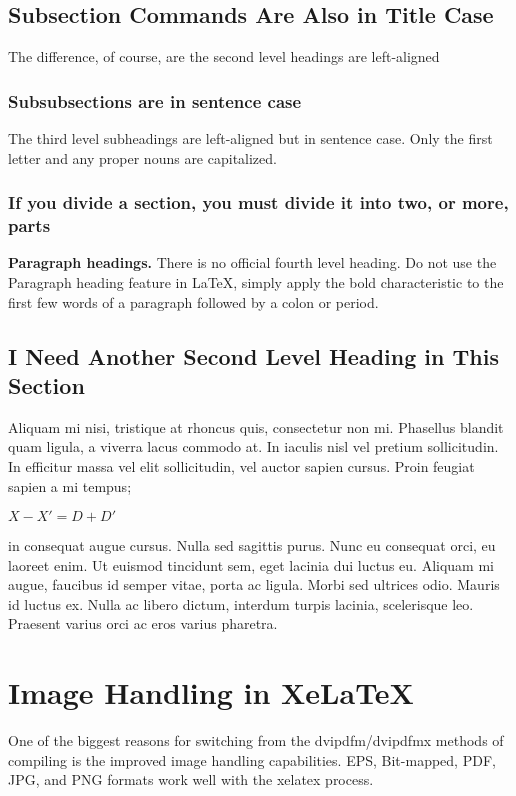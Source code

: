 \subsection{Subsection Commands Are Also in Title Case}
The difference, of course, are the second level headings are left-aligned

\subsubsection{Subsubsections are in sentence case}
The third level subheadings are left-aligned but in sentence case. Only the first letter and any proper nouns are capitalized. \cite{strickler1998contamination}

\subsubsection{If you divide a section, you must divide it into two, or more, parts}

{\bf Paragraph headings.} There is no official fourth level heading. Do not use the Paragraph heading feature in LaTeX, simply apply the bold characteristic to the first few words of a paragraph followed by a colon or period.

\subsection{I Need Another Second Level Heading in This Section}

Aliquam mi nisi, tristique at rhoncus quis, consectetur non mi. Phasellus blandit quam ligula, a viverra lacus commodo at. In iaculis nisl vel pretium sollicitudin. In efficitur massa vel elit sollicitudin, vel auctor sapien cursus. Proin feugiat sapien a mi tempus;

 $ X-X'=D+D'$

 in consequat augue cursus. Nulla sed sagittis purus. Nunc eu consequat orci, eu laoreet enim. Ut euismod tincidunt sem, eget lacinia dui luctus eu. Aliquam mi augue, faucibus id semper vitae, porta ac ligula. Morbi sed ultrices odio. Mauris id luctus ex. Nulla ac libero dictum, interdum turpis lacinia, scelerisque leo. Praesent varius orci ac eros varius pharetra.

\section{Image Handling in XeLaTeX}

One of the biggest reasons for switching from the dvipdfm/dvipdfmx methods of compiling is the improved image handling capabilities. EPS, Bit-mapped, PDF, JPG, and PNG formats work well with the xelatex process.

